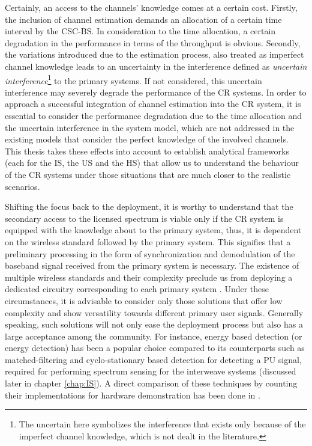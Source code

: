 Certainly, an access to the channels' knowledge comes at a certain cost. Firstly, the inclusion of channel estimation demands an allocation of a certain time interval by the CSC-BS. In consideration to the time allocation, a certain degradation in the performance in terms of the throughput is obvious. Secondly, the variations introduced due to the estimation process, also treated as imperfect channel knowledge leads to an uncertainty in the interference defined as \textit{uncertain interference}\footnote{The uncertain here symbolizes the interference that exists only because of the imperfect channel knowledge, which is not dealt in the literature.} to the primary systems. If not considered, this uncertain interference may severely degrade the performance of the CR systems. In order to approach a successful integration of channel estimation into the CR system, it is essential to consider the performance degradation due to the time allocation and the uncertain interference in the system model, which are not addressed in the existing models that consider the perfect knowledge of the involved channels. This thesis takes these effects into account to establish analytical frameworks (each for the IS, the US and the HS) that allow us to understand the behaviour of the CR systems under those situations that are much closer to the realistic scenarios. %

Shifting the focus back to the deployment, it is worthy to understand that the secondary access to the licensed spectrum is viable only if the CR system is equipped with the knowledge about to the primary system, thus, it is dependent on the wireless standard followed by the primary system. This signifies that a preliminary processing in the form of synchronization and demodulation of the baseband signal received from the primary system is necessary. The existence of multiple wireless standards and their complexity preclude us from deploying a dedicated circuitry corresponding to each primary system \cite{Ghasemi08_cm}. Under these circumstances, it is advisable to consider only those solutions that offer low complexity and show versatility towards different primary user signals. Generally speaking, such solutions will not only ease the deployment process but also has a large acceptance among the community. For instance, energy based detection (or energy detection) has been a popular choice compared to its counterparts such as matched-filtering and cyclo-stationary based detection for detecting a PU signal, required for performing spectrum sensing for the interweave systems (discussed later in chapter \ref{chap:IS}). A direct comparison of these techniques by counting their implementations for hardware demonstration has been done in \cite{Pawe11}. 

